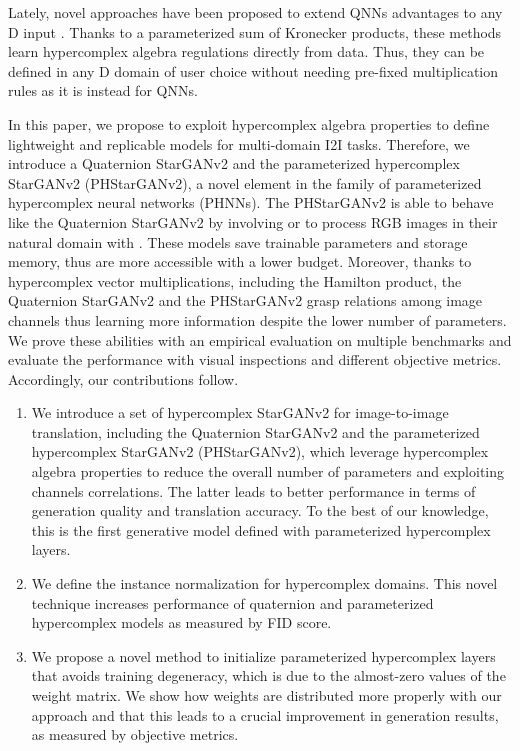 \documentclass[conference]{IEEEtran}
\begin{document}
Lately, novel approaches have been proposed to extend QNNs advantages to any D input \cite{Zhang2021PHM, grassucci2021lightweight, mahabadi2021compacter, le2021parameterized}. Thanks to a parameterized sum of Kronecker products, these methods learn hypercomplex algebra regulations directly from data. Thus, they can be defined in any D domain of user choice without needing pre-fixed multiplication rules as it is instead for QNNs. 

In this paper, we propose to exploit hypercomplex algebra properties to define lightweight and replicable models for multi-domain I2I tasks. Therefore, we introduce a Quaternion StarGANv2 and the parameterized hypercomplex StarGANv2 (PHStarGANv2), a novel element in the family of parameterized hypercomplex neural networks (PHNNs). The PHStarGANv2 is able to behave like the Quaternion StarGANv2 by involving  or to process RGB images in their natural domain with . These models save trainable parameters and storage memory, thus are more accessible with a lower budget. Moreover, thanks to hypercomplex vector multiplications, including the Hamilton product, the Quaternion StarGANv2 and the PHStarGANv2 grasp relations among image channels thus learning more information despite the lower number of parameters. We prove these abilities with an empirical evaluation on multiple benchmarks and evaluate the performance with visual inspections and different objective metrics.
Accordingly, our contributions follow.
\begin{enumerate}
    \item We introduce a set of hypercomplex StarGANv2 for image-to-image translation, including the Quaternion StarGANv2 and the parameterized hypercomplex StarGANv2 (PHStarGANv2), which leverage hypercomplex algebra properties to reduce the overall number of parameters and exploiting channels correlations. The latter leads to better performance in terms of generation quality and translation accuracy. To the best of our knowledge, this is the first generative model defined with parameterized hypercomplex layers.
    \item We define the instance normalization for hypercomplex domains. This novel technique increases performance of quaternion and parameterized hypercomplex models as measured by FID score.
    \item We propose a novel method to initialize parameterized hypercomplex layers that avoids training degeneracy, which is due to the almost-zero values of the weight matrix. We show how weights are distributed more properly with our approach and that this leads to a crucial improvement in generation results, as measured by objective metrics.
\end{enumerate}
\end{document}
